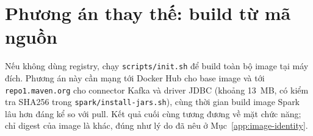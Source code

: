 \section{Phương án thay thế: build từ mã nguồn}

Nếu không dùng registry, chạy \texttt{scripts/init.sh} để build toàn bộ image
tại máy đích. Phương án này cần mạng tới Docker Hub cho base image và tới
\texttt{repo1.maven.org} cho connector Kafka và driver JDBC (khoảng 13~MB, có
kiểm tra SHA256 trong \texttt{spark/install-jars.sh}), cùng thời gian build
image Spark lâu hơn đáng kể so với pull. Kết quả cuối cùng tương đương về mặt
chức năng; chỉ digest của image là khác, đúng như lý do đã nêu ở
Mục~\ref{app:image-identity}.

